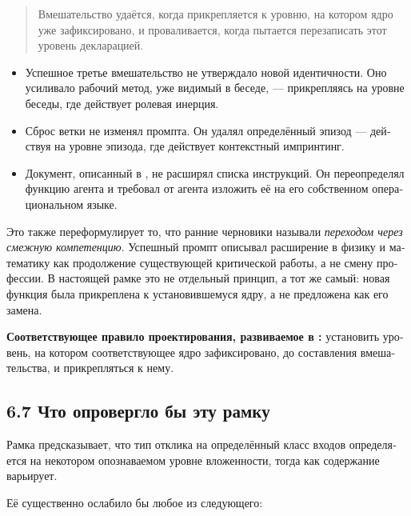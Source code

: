 \begin{russian}
\begin{quote}
Вмешательство удаётся, когда прикрепляется к уровню, на котором ядро уже зафиксировано, и проваливается, когда пытается перезаписать этот уровень декларацией.
\end{quote}
\begin{itemize}
  \item Успешное третье вмешательство не утверждало новой идентичности. Оно усиливало рабочий метод, уже видимый в беседе, — прикрепляясь на уровне беседы, где действует ролевая инерция.
  \item Сброс ветки не изменял промпта. Он удалял определённый эпизод — действуя на уровне эпизода, где действует контекстный импринтинг.
  \item Документ, описанный в , не расширял списка инструкций. Он переопределял функцию агента и требовал от агента изложить её на его собственном операциональном языке.
\end{itemize}
Это также переформулирует то, что ранние черновики называли \emph{переходом через смежную компетенцию}. Успешный промпт описывал расширение в физику и математику как продолжение существующей критической работы, а не смену профессии. В настоящей рамке это не отдельный принцип, а тот же самый: новая функция была прикреплена к установившемуся ядру, а не предложена как его замена.

\textbf{Соответствующее правило проектирования, развиваемое в :} установить уровень, на котором соответствующее ядро зафиксировано, до составления вмешательства, и прикрепляться к нему.


\subsection*{6.7 Что опровергло бы эту рамку}
\label{sec:ru:6.7}

Рамка предсказывает, что тип отклика на определённый класс входов определяется на некотором опознаваемом уровне вложенности, тогда как содержание варьирует.

Её существенно ослабило бы любое из следующего:


\end{russian}
